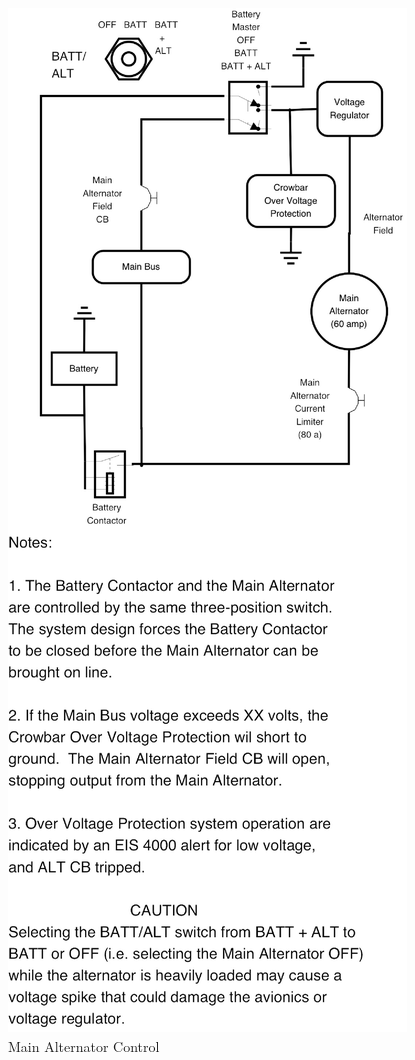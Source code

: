 \begin{figure}
\centering
\includegraphics[scale=0.4]{../Diagrams/Alternator_large_note_narrow_gc} \caption{Main Alternator Control}
\end{figure}

